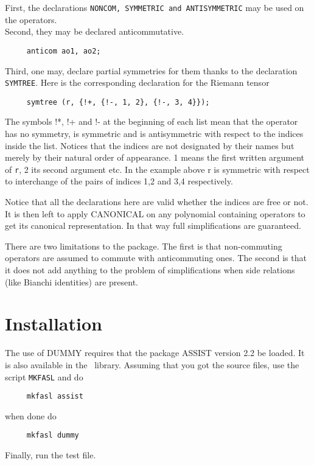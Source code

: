 First, the declarations {\tt NONCOM, SYMMETRIC and AN\-TI\-SYM\-ME\-TRIC}
 may be  used on the operators.\\
Second, they may be declared anticommutative.
\begin{verbatim}
     anticom ao1, ao2;
\end{verbatim}
Third, one may, declare partial symmetries for them thanks to the
declaration {\tt SYMTREE}.
Here is the corresponding declaration for the Riemann tensor
\begin{verbatim}
     symtree (r, {!+, {!-, 1, 2}, {!-, 3, 4}});
\end{verbatim}
The symbols !*, !+ and !- at the beginning of each list mean that
the operator has no symmetry, is symmetric and is antisymmetric with respect
to the indices inside the list. Notices that the indices are not designated
by their names but merely by their natural order of appearance. 1 means the
first written argument of {\tt r}, 2 its second argument etc.
In the example above r is symmetric with respect to interchange of the
pairs of indices 1,2 and 3,4 respectively.

Notice that all the declarations here are valid whether the indices
are free or not.
It is then left to apply {CANONICAL} on any polynomial containing operators
to get its canonical representation. In that way full simplifications
are guaranteed.

There are two limitations to the package. The first is that non-commuting
operators are assumed to commute with anticommuting ones. The second is
that it does not add anything to the problem of simplifications when
side relations (like Bianchi identities) are present.
\section{Installation}
The use of DUMMY requires that the package ASSIST  version 2.2 be loaded.
It is also available in the \REDUCE\ library. Assuming that you got the
source files, use the script {\tt MKFASL} and do
\begin{verbatim}
     mkfasl assist
\end{verbatim}
when done do
\begin{verbatim}
     mkfasl dummy
\end{verbatim}
Finally, run the test file.

